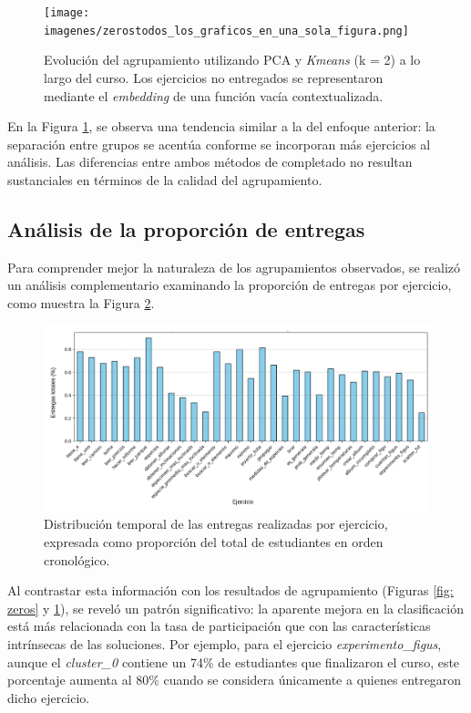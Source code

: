\documentclass[11pt,a4paper,twoside,openany]{tesis}
\begin{document}
\begin{figure}[H]
    \centering
    \texttt{[image: imagenes/zerostodos\_los\_graficos\_en\_una\_sola\_figura.png]}
    \caption{Evolución del agrupamiento utilizando PCA y \emph{Kmeans} (k = 2) a lo largo del curso. Los ejercicios no entregados se representaron mediante el \emph{embedding} de una función vacía contextualizada.}
    \label{fig: fill func}
\end{figure}

En la Figura \ref{fig: fill func}, se observa una tendencia similar a la del enfoque anterior: la separación entre grupos se acentúa conforme se incorporan más ejercicios al análisis. Las diferencias entre ambos métodos de completado no resultan sustanciales en términos de la calidad del agrupamiento.

\subsection{Análisis de la proporción de entregas}

Para comprender mejor la naturaleza de los agrupamientos observados, se realizó un análisis complementario examinando la proporción de entregas por ejercicio, como muestra la Figura \ref{entregas}.

\begin{figure}[H]
    \centering
    \includegraphics[width=\textwidth]{imagenes/proporcion - entregas (1).png}
    \caption{Distribución temporal de las entregas realizadas por ejercicio, expresada como proporción del total de estudiantes en orden cronológico.}
     \label{entregas}
\end{figure}

Al contrastar esta información con los resultados de agrupamiento (Figuras \ref{fig: zeros} y \ref{fig: fill func}), se reveló un patrón significativo: la aparente mejora en la clasificación está más relacionada con la tasa de participación que con las características intrínsecas de las soluciones. Por ejemplo, para el ejercicio \emph{experimento\_figus}, aunque el \emph{cluster\_0} contiene un 74\% de estudiantes que finalizaron el curso, este porcentaje aumenta al 80\% cuando se considera únicamente a quienes entregaron dicho ejercicio.
\end{document}
